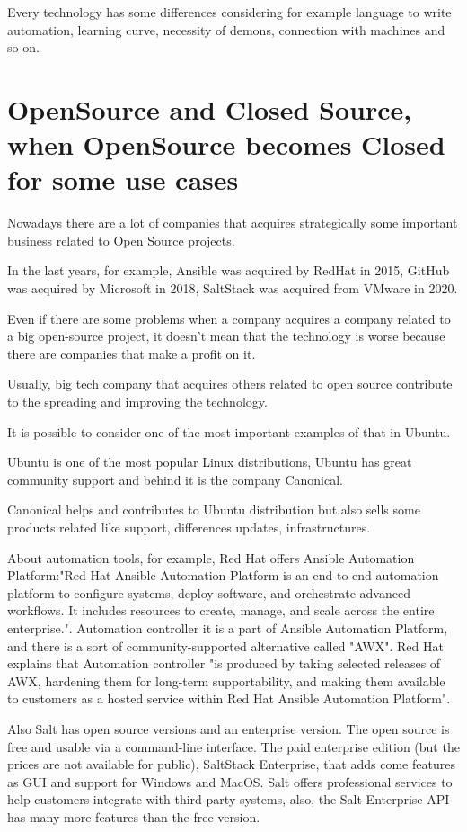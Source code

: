 \documentclass[12pt,a4paper,openright,twoside]{book}
\begin{document}
Every technology has some differences considering for example language to write automation, learning curve, necessity of demons, connection with machines and so on.

\section{OpenSource and Closed Source, when OpenSource becomes Closed for some use cases}
Nowadays there are a lot of companies that acquires strategically some important business related to Open Source projects.


In the last years, for example, Ansible was acquired by RedHat in 2015, GitHub was acquired by Microsoft in 2018, SaltStack was acquired from VMware in 2020.


Even if there are some problems when a company acquires a company related to a big open-source project, it doesn't mean that the technology is worse because there are companies that make a profit on it.

Usually, big tech company that acquires others related to open source contribute to the spreading and improving the technology.


It is possible to consider one of the most important examples of that in Ubuntu.


Ubuntu is one of the most popular Linux distributions, Ubuntu has great community support and behind it is the company Canonical.


Canonical helps and contributes to Ubuntu distribution but also sells some products related like support, differences updates, infrastructures.

About automation tools, for example, Red Hat offers Ansible Automation Platform:"Red Hat Ansible Automation Platform is an end-to-end automation platform to configure systems, deploy software, and orchestrate advanced workflows. It includes resources to create, manage, and scale across the entire enterprise."\cite{ansibleAutomationPlatform}.
Automation controller it is a part of Ansible Automation Platform, and there is a sort of community-supported alternative called "AWX"\cite{ansibleAwxAAP}.
Red Hat explains that Automation controller "is produced by taking selected releases of AWX, hardening them for long-term supportability, and making them available to customers as a hosted service within Red Hat Ansible Automation Platform"\cite{ansibleFaq}.

Also Salt has open source versions and an enterprise version. The open source is free and usable via a command-line interface.
The paid enterprise edition (but the prices are not available for public), SaltStack Enterprise, that adds come features as GUI and support for Windows and MacOS.
Salt offers professional services to help customers integrate with third-party systems, also, the Salt Enterprise API has many more features than the free version.\cite{saltTechTarget}
\end{document}
